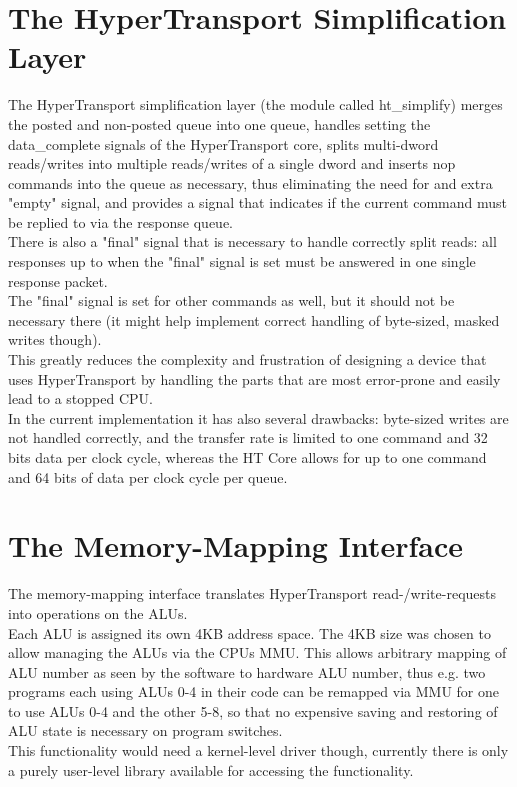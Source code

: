 \section{The HyperTransport Simplification Layer}
\label{sec:htsimplify}

The HyperTransport simplification layer (the module called ht\_simplify)
merges the posted and non-posted queue into one queue, handles setting
the data\_complete signals of the HyperTransport core, splits multi-dword
reads/writes into multiple reads/writes of a single dword and inserts nop
commands into the queue as necessary, thus eliminating the need for
and extra "empty" signal, and provides a signal that indicates
if the current command must be replied to via the response queue.\\
There is also a "final" signal that is necessary to handle correctly
split reads: all responses up to when the "final" signal is set
must be answered in one single response packet.\\
The "final" signal is set for other commands as well, but it should
not be necessary there (it might help implement correct handling
of byte-sized, masked writes though).\\
This greatly reduces the complexity and frustration of designing a device
that uses HyperTransport by handling the parts that are most error-prone
and easily lead to a stopped CPU.\\
In the current implementation it has also several drawbacks: byte-sized
writes are not handled correctly, and the transfer rate is limited to one command
and 32 bits data per clock cycle, whereas the HT Core allows for up to one
command and 64 bits of data per clock cycle per queue.\\

\section{The Memory-Mapping Interface}

The memory-mapping interface translates HyperTransport read-/write-requests into
operations on the ALUs.\\
Each ALU is assigned its own 4KB address space. The 4KB size was chosen to allow
managing the ALUs via the CPUs MMU.
This allows arbitrary mapping of ALU number as seen by the software to hardware
ALU number, thus e.g. two programs each using ALUs 0-4 in their code can be remapped
via MMU for one to use ALUs 0-4 and the other 5-8, so that no expensive saving and
restoring of ALU state is necessary on program switches.\\
This functionality would need a kernel-level driver though, currently there is only
a purely user-level library available for accessing the functionality.\\

